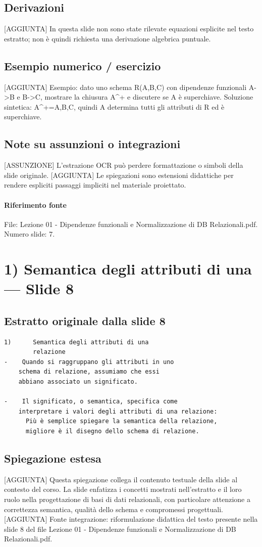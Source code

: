 \documentclass[11pt]{article}
\begin{document}
\subsection*{Derivazioni}
[AGGIUNTA] In questa slide non sono state rilevate equazioni esplicite nel testo estratto; non è quindi richiesta una derivazione algebrica puntuale.
\subsection*{Esempio numerico / esercizio}
[AGGIUNTA] Esempio: dato uno schema R(A,B,C) con dipendenze funzionali A->B e B->C, mostrare la chiusura A^+ e discutere se A è superchiave. Soluzione sintetica: A^+={A,B,C}, quindi A determina tutti gli attributi di R ed è superchiave.
\subsection*{Note su assunzioni o integrazioni}
[ASSUNZIONE] L'estrazione OCR può perdere formattazione o simboli della slide originale.
[AGGIUNTA] Le spiegazioni sono estensioni didattiche per rendere espliciti passaggi impliciti nel materiale proiettato.
\paragraph{Riferimento fonte} File: Lezione 01 - Dipendenze funzionali e Normalizzazione di DB Relazionali.pdf. Numero slide: 7.
\section{1) Semantica degli attributi di una --- Slide 8}
\subsection*{Estratto originale dalla slide 8}
\begin{lstlisting}
1)      Semantica degli attributi di una
        relazione
-    Quando si raggruppano gli attributi in uno
    schema di relazione, assumiamo che essi
    abbiano associato un significato.

-    Il significato, o semantica, specifica come
    interpretare i valori degli attributi di una relazione:
      Più è semplice spiegare la semantica della relazione,
      migliore è il disegno dello schema di relazione.
\end{lstlisting}
\subsection*{Spiegazione estesa}
[AGGIUNTA] Questa spiegazione collega il contenuto testuale della slide al contesto del corso. La slide enfatizza i concetti mostrati nell'estratto e il loro ruolo nella progettazione di basi di dati relazionali, con particolare attenzione a correttezza semantica, qualità dello schema e compromessi progettuali.
[AGGIUNTA] Fonte integrazione: riformulazione didattica del testo presente nella slide 8 del file Lezione 01 - Dipendenze funzionali e Normalizzazione di DB Relazionali.pdf.
\end{document}
